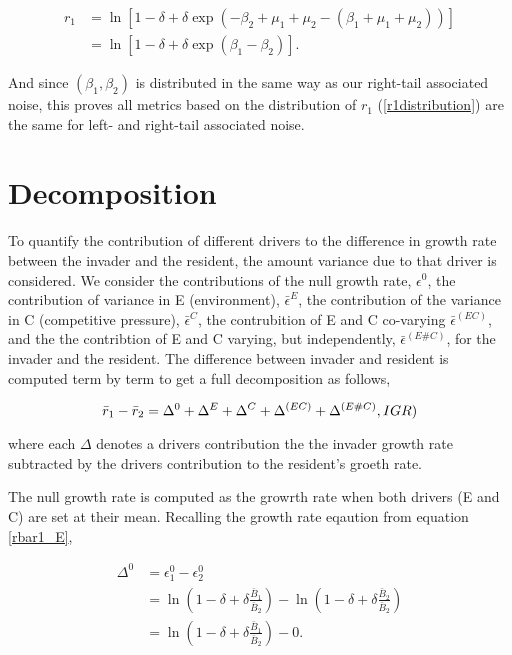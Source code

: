 \documentclass[letterpaper,11pt]{article}
\begin{document}
\begin{align}
r_1 &= \ln[1-\delta+\delta \exp(-\beta_2+\mu_1+\mu_2-(\beta_1+\mu_1+\mu_2))]\\
&= \ln[1-\delta+\delta \exp(\beta_1-\beta_2)].
\end{align}

\noindent And since $(\beta_1, \beta_2)$ is distributed in the same way as our right-tail associated noise, this proves all metrics based on the distribution of $r_1$ (\ref{r1distribution}) are the same for left- and right-tail associated noise.



\section{Decomposition}

To quantify the contribution of different drivers to the difference in growth rate between the invader and the resident, the amount variance due to that driver is considered. We consider the contributions of the null growth rate, $\epsilon^0$, the contribution of variance in E (environment), $\bar \epsilon^E$, the contribution of the variance in C (competitive pressure), $\bar \epsilon^C$, the contrubition of E and C co-varying $\bar \epsilon^{(EC)}$, and the the contribtion of E and C varying, but independently, $\bar \epsilon^{(E\#C)}$, for the invader and the resident. The difference between invader and resident is computed term by term to get a full decomposition as follows,

\begin{equation}
\bar r_1-\bar r_2 = \Delta^0+\Delta^E+\Delta^C+\Delta^{(EC)}+\Delta^{(E\#C)}, \label(IGR)
\end{equation}

\noindent where each $\Delta$ denotes a drivers contribution the the invader growth rate subtracted by the drivers contribution to the resident's groeth rate.

The null growth rate is computed as the growrth rate when both drivers (E and C) are set at their mean. Recalling the growth rate eqaution from equation \ref{rbar1_E},

\begin{align}
\Delta^0 &= \epsilon_1^0 - \epsilon_2^0\\
&=\ln(1-\delta + \delta \frac{\bar B_1}{\bar B_2}) - \ln(1-\delta + \delta \frac{\bar B_2}{\bar B_2})\\
&=\ln(1-\delta + \delta \frac{\bar B_1}{\bar B_2}) - 0. \\
\end{align}
\end{document}
